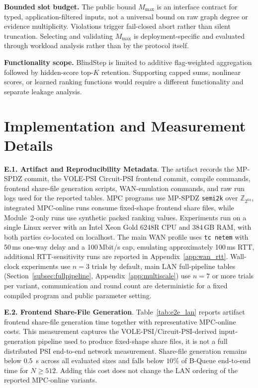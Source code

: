 \documentclass[conference,compsoc,letterpaper]{IEEEtran}
\theoremstyle{definition}
\theoremstyle{remark}
\newcommand{\myparagraph}[1]{\noindent \textbf{#1}.}
\newcommand{\BlindStep}{BlindStep\xspace}
\newcommand{\Mmax}{M_{\max}}
\newcommand{\BQueue}{B-Queue}
\begin{document}
\noindent\textbf{Bounded slot budget.}
The public bound $\Mmax$ is an interface contract for typed, application-filtered inputs, not a universal bound on raw graph degree or evidence multiplicity.
Violations trigger fail-closed abort rather than silent truncation.
Selecting and validating $\Mmax$ is deployment-specific and evaluated through workload analysis rather than by the protocol itself.

\noindent\textbf{Functionality scope.}
\BlindStep{} is limited to additive flag-weighted aggregation followed by hidden-score top-$K$ retention.
Supporting capped sums, nonlinear scores, or learned ranking functions would require a different functionality and separate leakage analysis.

\section{Implementation and Measurement Details}
\label{app:impl_measurement_details}
\vspace{-2mm}

\myparagraph{E.1. Artifact and Reproducibility Metadata}
\label{app:artifact_metadata}
The artifact records the MP-SPDZ commit, the VOLE-PSI Circuit-PSI frontend commit, compile commands, frontend share-file generation scripts, WAN-emulation commands, and raw run logs used for the reported tables.
MPC programs use MP-SPDZ \texttt{semi2k} over $\mathbb{Z}_{2^{64}}$, integrated MPC-online runs consume fixed-shape frontend share files, while Module~2-only runs use synthetic packed ranking values.
Experiments run on a single Linux server with an Intel Xeon Gold 6248R CPU and 384\,GB RAM, with both parties co-located on localhost.
The main WAN profile uses \texttt{tc netem} with 50\,ms one-way delay and a 100\,Mbit/s cap, emulating approximately 100\,ms RTT, additional RTT-sensitivity runs are reported in Appendix~\ref{app:wan_rtt}.
Wall-clock experiments use $n=3$ trials by default, main LAN full-pipeline tables (Section~\ref{subsec:fullpipeline}, Appendix~\ref{app:multiscale}) use $n=7$ or more trials per variant, communication and round count are deterministic for a fixed compiled program and public parameter setting.

\myparagraph{E.2. Frontend Share-File Generation}
\label{app:e2e}
Table~\ref{tab:e2e_lan} reports artifact frontend share-file generation time together with representative MPC-online costs. This measurement captures the VOLE-PSI/Circuit-PSI-derived input-generation pipeline used to produce fixed-shape share files, it is not a full distributed PSI end-to-end network measurement. Share-file generation remains below \(0.5\)~s across all evaluated sizes and falls below \(10\%\) of \BQueue{} end-to-end time for \(N\ge512\). Adding this cost does not change the LAN ordering of the reported MPC-online variants.
\end{document}
